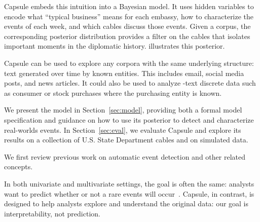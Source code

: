 Capsule embeds this intuition into a Bayesian model. It uses hidden
variables to encode what ``typical business'' means for each embassy,
how to characterize the events of each week, and which cables discuss
those events. Given a corpus, the corresponding posterior distribution
provides a filter on the cables that isolates important moments in the
diplomatic history.  illustrates this
posterior.

Capsule can be used to explore any corpora with the same underlying
structure: text generated over time by known entities.  This includes
email, social media posts, and news articles.  It could also be used to analyze 
-text discrete data such as consumer or stock purchases where the
purchasing entity is known.

We present the model in Section~\ref{sec:model}, providing both a formal
model specification and guidance on how to use its posterior to detect 
and characterize real-worlds events.
In Section~\ref{sec:eval}, we evaluate Capsule and explore its results on
a collection of U.S. State Department cables and on simulated data.

 We first review previous work on automatic
event detection and other related concepts.

In both univariate and multivariate settings, the goal is often the same: analysts want to predict whether or not a rare events will occur~\cite{weiss1998learning,das2008anomaly}.  Capsule, in contrast, is designed to help analysts explore and understand the original data: our goal is interpretability, not prediction.

